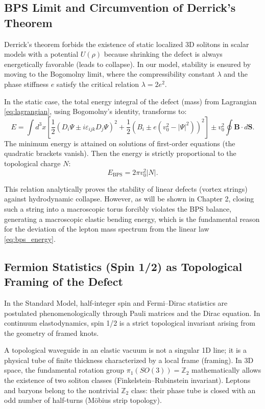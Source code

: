 \documentclass[11pt,a4paper]{article}
\begin{document}
\subsection{BPS Limit and Circumvention of Derrick's Theorem}
Derrick's theorem forbids the existence of static localized 3D solitons in scalar models with a potential $U(\rho)$ because shrinking the defect is always energetically favorable (leads to collapse).
In our model, stability is ensured by moving to the Bogomolny limit, where the compressibility constant $\lambda$ and the phase stiffness $e$ satisfy the critical relation $\lambda = 2e^2$.

In the static case, the total energy integral of the defect (mass) from Lagrangian \eqref{eq:lagrangian}, using Bogomolny's identity, transforms to:
\begin{equation}
E = \int d^3x \left[ \frac{1}{2} \left( D_i \Psi \pm i \varepsilon_{ijk} D_j \Psi \right)^2 + \frac{1}{2} \left( B_i \pm e(v_0^2 - |\Psi|^2) \right)^2 \right] \pm v_0^2 \oint \mathbf{B} \cdot d\mathbf{S}.
\end{equation}
The minimum energy is attained on solutions of first-order equations (the quadratic brackets vanish). Then the energy is strictly proportional to the topological charge $N$:
\begin{equation}
E_{\text{BPS}} = 2\pi v_0^2 |N|.
\label{eq:bps_energy}
\end{equation}

This relation analytically proves the stability of linear defects (vortex strings) against hydrodynamic collapse. However, as will be shown in Chapter 2, closing such a string into a macroscopic torus forcibly violates the BPS balance, generating a macroscopic elastic bending energy, which is the fundamental reason for the deviation of the lepton mass spectrum from the linear law \eqref{eq:bps_energy}.

\subsection{Fermion Statistics (Spin 1/2) as Topological Framing of the Defect}

In the Standard Model, half-integer spin and Fermi–Dirac statistics are postulated phenomenologically through Pauli matrices and the Dirac equation. In continuum elastodynamics, spin 1/2 is a strict topological invariant arising from the geometry of framed knots.

A topological waveguide in an elastic vacuum is not a singular 1D line; it is a physical tube of finite thickness characterized by a local frame (framing). In 3D space, the fundamental rotation group $\pi_1(SO(3)) = \mathbb{Z}_2$ mathematically allows the existence of two soliton classes (Finkelstein–Rubinstein invariant).
Leptons and baryons belong to the nontrivial $\mathbb{Z}_2$ class: their phase tube is closed with an odd number of half-turns (Möbius strip topology).
\end{document}
